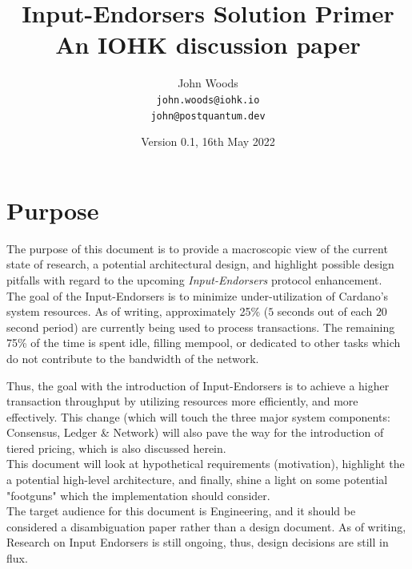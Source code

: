 \documentclass[11pt,a4paper]{article}
\begin{document}
\title {Input-Endorsers Solution Primer \\
       {\large \sc An IOHK discussion paper}}
\date  {Version 0.1, 16th May 2022}
\author{John Woods         \\ {\small \texttt{john.woods@iohk.io}} \\
                              {\small \texttt{john@postquantum.dev}} \\
}

\maketitle

\section{Purpose}
The purpose of this document is to provide a macroscopic view of the current state of 
research, a potential architectural design, and highlight possible design pitfalls 
with regard to the upcoming \emph{Input-Endorsers} protocol enhancement. \\ 

The goal of the Input-Endorsers is to minimize under-utilization of Cardano's system resources.
As of writing, approximately 25\% ($5$ seconds out of each $20$ second period) are currently being used to process
transactions. The remaining 75\% of the time is spent idle, filling mempool, or dedicated to other tasks
which do not contribute to the bandwidth of the network.

Thus, the goal with the introduction of Input-Endorsers is to achieve a higher transaction throughput
by utilizing resources more efficiently, and more effectively. This change (which will touch the three 
major system components: Consensus, Ledger \& Network) will also pave the way for the introduction of tiered
pricing, which is also discussed herein. \\

This document will look at hypothetical requirements (motivation), highlight the a potential high-level
architecture, and finally, shine a light on some potential "footguns" which the implementation should consider. \\

The target audience for this document is Engineering, and it should be considered a disambiguation paper 
rather than a design document. As of writing, Research on Input Endorsers is still ongoing, thus, design 
decisions are still in flux.
\pagebreak
\end{document}
